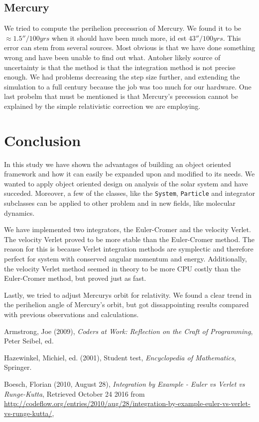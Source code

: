 \documentclass[10pt,a4paper]{amsart}
\begin{document}
\subsection{Mercury}

We tried to compute the perihelion precessrion of Mercury. We found it to be $\approx1.5''/100yrs$ when it should have been much more, id est $43''/100yrs$. This error can stem from several sources. Most obvious is that we have done something wrong and have been unable to find out what. Antoher likely source of uncertainty is that the method is that the integration method is not precise enough. We had problems decreasing the step size further, and extending the simulation to a full century because the job was too much for our hardware. One last probelm that must be mentioned is that Mercury's precession cannot be explained by the simple relativistic correction we are employing.

\section{Conclusion}

In this study we have shown the advantages of building an object oriented framework and how it can easily be expanded upon and modified to its needs. We wanted to apply object oriented design on analysis of the solar system and have succeded. Moreover, a few of the classes, like the \lstinline|System|, \lstinline|Particle| and integrator subclasses can be applied to other problem and in new fields, like molecular dynamics. 

We have implemented two integrators, the Euler-Cromer and the velocity Verlet. The velocity Verlet proved to be more stable than the Euler-Cromer method. The reason for this is because Verlet integration methods are symplectic and therefore perfect for system with conserved angular momentum and energy. Additionally, the velocity Verlet method seemed in theory to be more CPU costly than the Euler-Cromer method, but proved just as fast.

Lastly, we tried to adjust Mercurys orbit for relativity. We found a clear trend in the perihelion angle of Mercury's orbit, but got dissappointing results compared with previous observations and calculations.

\begin{thebibliography}{9}

	Armstrong, Joe (2009),
	\emph{Coders at Work: Reflection on the Craft of Programming},
	Peter Seibel, ed.

	Hazewinkel, Michiel, ed. (2001), 
	Student test,
	\emph{Encyclopedia of Mathematics},
	Springer.
	
	Boesch, Florian (2010, August 28),
	\emph{Integration by Example - Euler vs Verlet vs Runge-Kutta},
	Retrieved October 24 2016 from \url{http://codeflow.org/entries/2010/aug/28/integration-by-example-euler-vs-verlet-vs-runge-kutta/},

\end{thebibliography}
\end{document}
